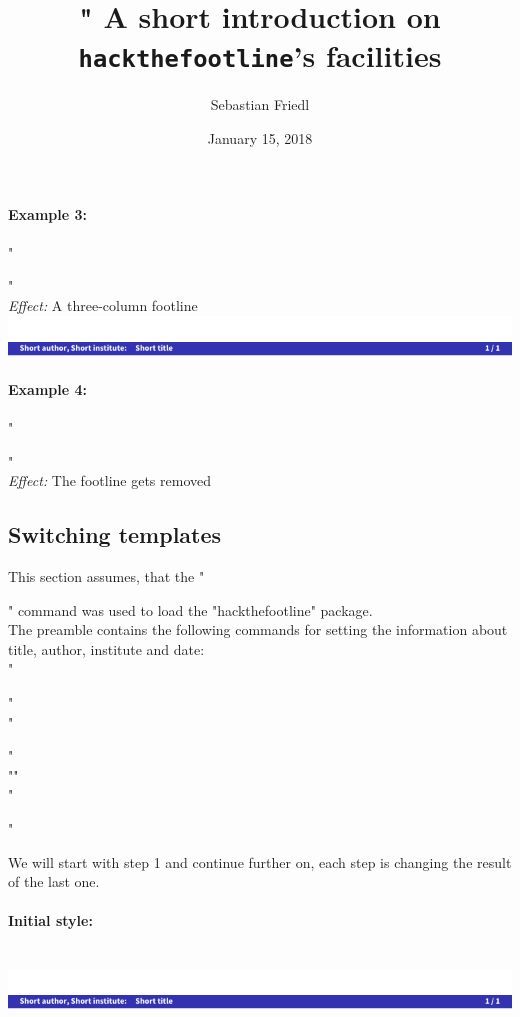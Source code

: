 \documentclass[11pt]{ltxdoc}
\begin{document}
	\paragraph{Example 3:}
	"\usepackage[threecols]{hackthefootline}" \\
	\textit{Effect:} A three-column footline \\
	\includegraphics[page=3, width=\textwidth, trim=0 0 0 15, clip]{hackthefootline-examples}
	
	\paragraph{Example 4:}
	"\usepackage{hackthefootline}" \\
	\textit{Effect:} The footline gets removed
	
	
	\subsection{Switching templates}\label{examples-switchtemplates}
	This section assumes, that the "\usepackage[twocols]{hackthefootline}" command was used to load the "hackthefootline" package. \\[\medskipamount]
	The preamble contains the following commands for setting the information about title, author, institute and date: \\[\smallskipamount]
	"\title[Short Introduction]{%
	"    A short introduction on \texttt{hackthefootline}'s facilities}" \\
	"\author[S. Friedl]{Sebastian Friedl}" \\
	"" \\
	"\date[2018/01/15]{January 15, 2018}"
	
	\medskip
	We will start with step 1 and continue further on, each step is changing the result of the last one.
	
	\paragraph{Initial style:}~ \\
	\includegraphics[page=4, width=\textwidth, trim=0 0 0 15, clip]{hackthefootline-examples}
	
\end{document}
